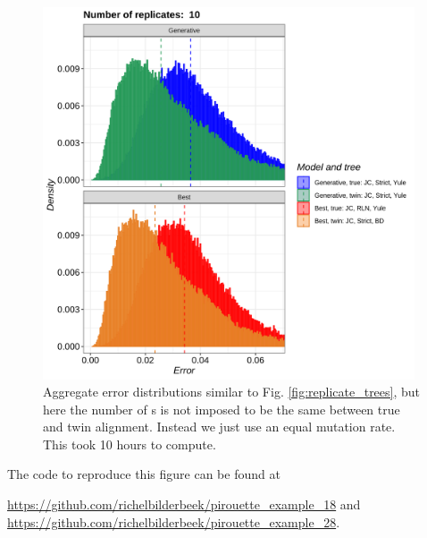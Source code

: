 \begin{figure}[H]
  \includegraphics[width=0.98\textwidth]{pirouette_example_18/errors.png}
  \caption{Aggregate error distributions similar to Fig. \ref{fig:replicate_trees}, but here the number of s is not imposed to be the same between true and twin alignment. Instead we just use an equal mutation rate. This took 10 hours to compute.}
  \label{fig:example_random_mutations}
\end{figure}


The code to reproduce this figure can be found at
\begin{sloppypar}
  \url{https://github.com/richelbilderbeek/pirouette_example_18} and
  \url{https://github.com/richelbilderbeek/pirouette_example_28}.
\end{sloppypar}

\clearpage

